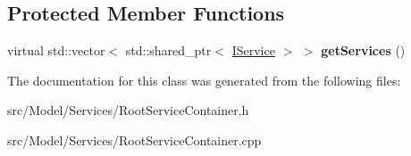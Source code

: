 \subsection*{Protected Member Functions}
\begin{DoxyCompactItemize}
\item 
virtual std\+::vector$<$ std\+::shared\+\_\+ptr$<$ \hyperlink{classIService}{I\+Service} $>$ $>$ {\bfseries get\+Services} ()\hypertarget{classRootServiceContainer_a5ec6d2044f0a90c4c85f29b616ed2ec3}{}\label{classRootServiceContainer_a5ec6d2044f0a90c4c85f29b616ed2ec3}

\end{DoxyCompactItemize}


The documentation for this class was generated from the following files\+:\begin{DoxyCompactItemize}
\item 
src/\+Model/\+Services/Root\+Service\+Container.\+h\item 
src/\+Model/\+Services/Root\+Service\+Container.\+cpp\end{DoxyCompactItemize}
